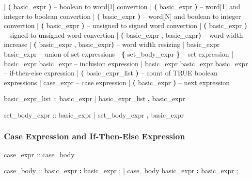 \begin{Grammar}
      |  \textbf{(} basic_expr \textbf{)} 
                                 \footnotesize{-- boolean to word[1] convertion}
      |  \textbf{(} basic_expr \textbf{)}  
                                 \footnotesize{-- word[1] and integer to boolean convertion}
      |  \textbf{(} basic_expr \textbf{)}  
                                 \footnotesize{-- word[N] and boolean to integer convertion}
      |  \textbf{(} basic_expr \textbf{)}
                                 \footnotesize{-- unsigned to signed word convertion}
      |  \textbf{(} basic_expr \textbf{)}
                                 \footnotesize{-- signed to unsigned word convertion}
      |  \textbf{(} basic_expr , basic_expr\textbf{)}  
                                 \footnotesize{-- word width increase}
      |  \textbf{(} basic_expr , basic_expr\textbf{)}  
                                 \footnotesize{-- word width resizing}
      | basic_expr  basic_expr 
                                 \footnotesize{-- union of set expressions }
      | \textbf{\{} set_body_expr \textbf{\}}            \footnotesize{-- set expression}
      | basic_expr  basic_expr   \footnotesize{-- inclusion expression}
      | basic_expr  basic_expr \operator{:} basic_expr  
                                 \footnotesize{-- if-then-else expression}
      |  \textbf{(} basic_expr_list \textbf{)} 
                       \footnotesize{-- count of TRUE boolean expressions}
      | case_expr                    \footnotesize{-- case expression}
      |  \textbf{(} basic_expr \textbf{)}       \footnotesize{-- next expression}

basic_expr_list ::
        basic_expr
      | basic_expr_list \textbf{,} basic_expr
\end{Grammar}
 

\begin{Grammar}
set_body_expr :: 
        basic_expr
      | set_body_expr \textbf{,} basic_expr
\end{Grammar}


\subsubsection{Case Expression and If-Then-Else Expression}
\begin{Grammar}
case_expr ::  case_body 

case_body ::
        basic_expr \textbf{:} basic_expr {;}
      | case_body basic_expr \textbf{:} basic_expr {;}
\end{Grammar}


